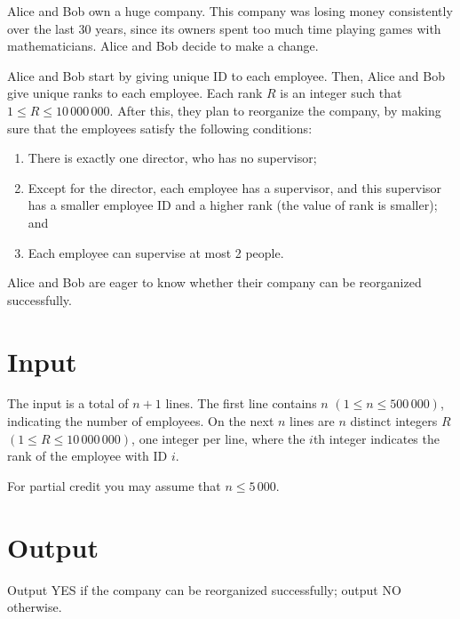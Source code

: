 Alice and Bob own a huge company. This company was losing money consistently over the last 30
years, since its owners spent too much time playing games with mathematicians. Alice and Bob
decide to make a change.

Alice and Bob start by giving unique ID to each employee. Then, Alice and Bob give unique ranks to
each employee. Each rank $R$ is an integer such that $1 \le R \le 10\,000\,000$. After this, they
plan to reorganize the company, by making sure that the employees satisfy the following conditions:
\begin{enumerate}
\item There is exactly one director, who has no supervisor;
\item Except for the director, each employee has a supervisor, and this supervisor has a smaller
employee ID and a higher rank (the value of rank is smaller); and
\item Each employee can supervise at most 2 people.
\end{enumerate}

Alice and Bob are eager to know whether their company can be reorganized successfully.

\section*{Input}
The input is a total of $n + 1$ lines. The first line contains $n$ $(1 \le n \le 500\,000)$,
indicating the number of employees. On the next $n$ lines are $n$ distinct integers $R$ $(1 \le R
\le 10\,000\,000)$, one integer per line, where the $i$th integer indicates the rank of the employee
with ID $i$.

For partial credit you may assume that $n\le 5\,000$.

\section*{Output}
Output YES if the company can be reorganized successfully; output NO otherwise.
